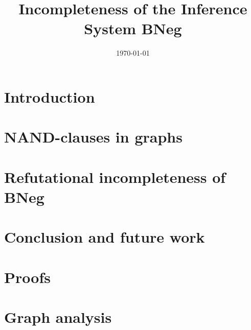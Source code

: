\documentclass[11pt, a4paper]{report}   	%
\title{Incompleteness of the Inference System BNeg}
\author{\name}
\date{\today}
\theoremstyle{plain}
\theoremstyle{definition}
\begin{document}
	\maketitle
  \begin{abstract}
    
  \end{abstract}
	\tableofcontents
  \chapter{Introduction}
  \label{chap:Introduction}
  
  
  
  
	
	
	
	
	\chapter{NAND-clauses in graphs}
	\label{chap:NAND-clauses in graphs}
	
	
	
	
  
	
  
	\chapter{Refutational incompleteness of BNeg}
	\label{chap:Refutational incompleteness of BNeg}
	
	
	
  
  \pagebreak %
  
  
  \chapter{Conclusion and future work}
  \label{chap:Conclusion and future work}
  
  \appendix
  \chapter{Proofs}
  \label{chap:Proofs}
  
	\pagebreak
	
	\pagebreak
	
  \pagebreak
  \chapter{Graph analysis}
  \label{chap:Graph analysis}
  
  \pagebreak
	\printbibliography
\end{document}
